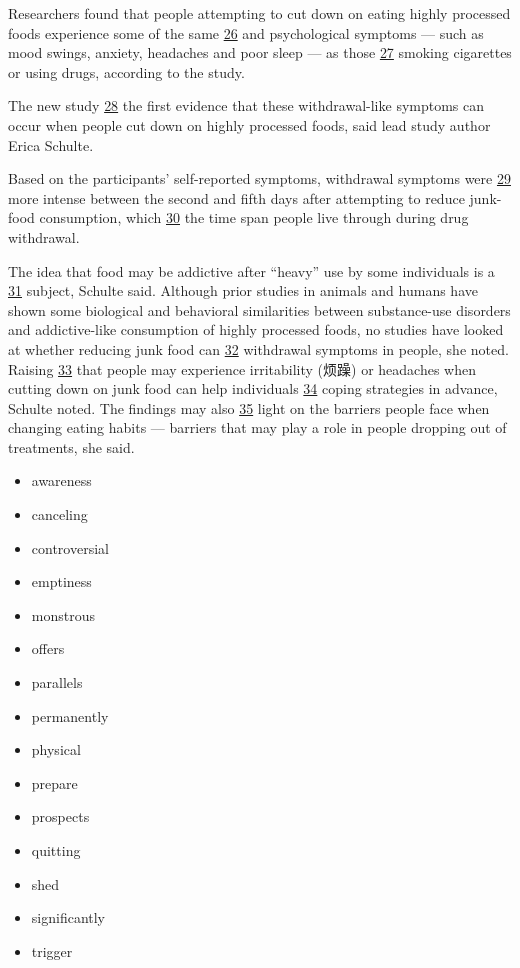 \documentclass[UTF8,11pt]{ctexart}
\begin{document}
Researchers found that people attempting to cut down on eating highly processed foods experience some of the same \uline{26} and psychological symptoms — such as mood swings, anxiety, headaches and poor sleep — as those \uline{27} smoking cigarettes or using drugs, according to the study.


The new study \uline{28} the first evidence that these withdrawal-like symptoms can occur when people cut down on highly processed foods, said lead study author Erica Schulte.


Based on the participants’ self-reported symptoms, withdrawal symptoms were \uline{29} more intense between the second and fifth days after attempting to reduce junk-food consumption, which \uline{30} the time span people live through during drug withdrawal.


The idea that food may be addictive after “heavy” use by some individuals is a \uline{31} subject, Schulte said. Although prior studies in animals and humans have shown some biological and behavioral similarities between substance-use disorders and addictive-like consumption of highly processed foods, no studies have looked at whether reducing junk food can \uline{32} withdrawal symptoms in people, she noted. Raising \uline{33} that people may experience irritability (烦躁) or headaches when cutting down on junk food can help individuals \uline{34} coping strategies in advance, Schulte noted. The findings may also \uline{35} light on the barriers people face when changing eating habits — barriers that may play a role in people dropping out of treatments, she said.


\begin{itemize}[leftmargin=2em,itemsep=.2em,topsep=.4em]\item[A.] awareness
\item[B.] canceling
\item[C.] controversial
\item[D.] emptiness
\item[E.] monstrous
\item[F.] offers
\item[G.] parallels
\item[H.] permanently
\item[I.] physical
\item[J.] prepare
\item[K.] prospects
\item[L.] quitting
\item[M.] shed
\item[N.] significantly
\item[O.] trigger
\end{itemize}
\end{document}
